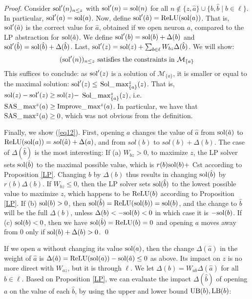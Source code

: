 	
	\begin{proof}
    Consider $\mathrm{sol}'(n)_{n \leq z}$ with
	$\mathrm{sol}'(n)=\mathrm{sol}(n)$ for all $n \notin \{z,\hat{a}\} \cup \{b,\hat{b} \mid b \in \ell\}$. In particular,  $\mathrm{sol}'(a) = \mathrm{sol}(a)$.
	Now, define $\mathrm{sol}'(\hat{a}) = \mathrm{ReLU}(\mathrm{sol}(a))$. 
	That is, $\mathrm{sol}'(\hat{a})$ is the correct value for $\hat{a}$, obtained if we open neuron $a$, compared to the LP abstraction for $\mathrm{sol}(\hat{a})$.
	We define $\mathrm{sol}'(b)=\mathrm{sol}(b)+\Delta(b)$ and 
	$\mathrm{sol}'(\hat{b})=\mathrm{sol}(\hat{b}) + \Delta(\hat{b})$.
	Last, $\mathrm{sol}'(z)=\mathrm{sol}(z) + \sum_{b \in \ell} W_{bz} \Delta(\hat{b})$.
	We will show:
	\begin{equation}
		\label{eq12}
		(\mathrm{sol}'(n))_{n \leq z} \text{ satisfies the constraints in } \mathcal{M}_{\{a\}}
	\end{equation} 
	This suffices to conclude: as
	$\mathrm{sol}'(z)$ is a solution of $\mathcal{M}_{\{a\}}$, it is smaller or equal to the maximal solution: $\mathrm{sol}'(z) \leq$ $\mathrm{Sol}\_\max_{\{a\}}^z(z)$. That is, 
	$\mathrm{sol}(z)-\mathrm{sol}'(z) \geq \mathrm{sol}(z) -$ $\mathrm{Sol}\_\max_{\{a\}}^z(z)$, i.e. 
	$ \mathrm{SAS}\_\max^z(a) \geq \mathrm{Improve}\_\max^z(a)$.
	In particular, we have that $\mathrm{SAS}\_\max^z(a) \geq 0$, which was not obvious from the definition.


	

	Finally, we show (\ref{eq12}). First, opening $a$ changes the value of $\hat{a}$ from
	$\mathrm{sol}(\hat{a})$ to $\mathrm{ReLU}(\mathrm{sol}(a)) = sol(\hat{a}) + \Delta(a)$, 
	and from $sol(b)$ to $sol(b) + \Delta(b)$.
	The case of $\Delta(\hat{b})$ is the most interesting:
	If (a) $W_{bz}>0$, to maximize $z$, the LP solver sets $\mathrm{sol}(\hat{b})$ to the maximal possible value, which is 
	$r(b) \mathrm{sol}(b)+$ Cst according to Proposition \ref{LP}.
Changing $b$ by $\Delta(b)$ thus results in changing $\mathrm{sol}(\hat{b})$ by 
$r(b) \Delta(b)$.
If $W_{bz}\leq0$, then the LP solver sets $\mathrm{sol}(\hat{b})$ to the lowest possible value to maximize $z$, which happens to be $\mathrm{ReLU}(b)$ according to Proposition \ref{LP}.
If (b) $\mathrm{sol}(b) > 0$, then 
$\mathrm{sol}(\hat{b})=\mathrm{ReLU}(\mathrm{sol}(b))=\mathrm{sol}(b)$, and the change to $\hat{b}$ will be 
the full $\Delta(b)$, unless $\Delta(b) < -\mathrm{sol}(b) < 0$ in which case it is 
$-\mathrm{sol}(b)$.
If (c) $\mathrm{sol}(b) < 0$, then we have $\mathrm{sol}(\hat{b})=\mathrm{ReLU}(b)=0$ and opening $a$ moves away 
from 0 only if $\mathrm{sol}(b)+\Delta(b)>0$. 
 \qed
		\end{proof}


	\iffalse

	If we open $a$ without changing its value $\mathrm{sol}(a)$, then the change $\Delta(\hat{a})$ in the weight of $\hat{a}$ is 
$\Delta(\hat{a})=\mathrm{ReLU}(\mathrm{sol}(a)) - \mathrm{sol}(\hat{a}) \leq 0$ as above. Its impact on $z$ is no more direct with $W_{az}$, but it is through $\ell$. 
We let $\Delta(b) = W_{ab}\Delta(\hat{a})$ for all $b \in \ell$.
Based on Proposition \ref{LP}, we can evaluate the impact 
$\Delta(\hat{b})$ of opening $a$ on the value of each $\hat{b}$, by using the upper and lower bound $\mathrm{UB}(b),\mathrm{LB}(b)$:

